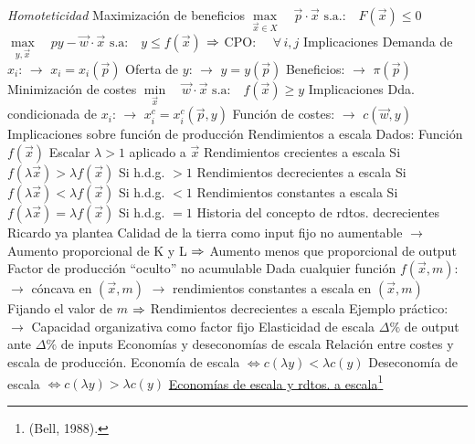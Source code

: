 \documentclass{nuevotema}
\begin{document}
\begin{esquemal}
				\4[xiii] \textit{Homoteticidad}
			\3 Maximización de beneficios
				\4[] $\underset{\vec{x} \in X}{\max} \quad \vec{p}\cdot \vec{x}$
				\4[] $\text{s.a.:} \quad F(\vec{x}) \leq 0$
				\4[] $\underset{y, \vec{x}}{\max} \quad p y - \vec{w} \cdot \vec{x}$
				\4[] $\text{s.a:} \quad y \leq f(\vec{x})$
				\4[] $\Rightarrow$ $\text{CPO:} \quad $  \quad $\forall \, i,j$
				\4 Implicaciones
				\4[] Demanda de $x_i$:
				\4[] $\to$ $x_i = x_i(\vec{p})$
				\4[] Oferta de $y$:
				\4[] $\to$ $y = y(\vec{p})$
				\4[] Beneficios:
				\4[] $\to$ $\pi(\vec{p})$
			\3 Minimización de costes
				\4[] $\underset{\vec{x}}{\min} \quad \vec{w} \cdot \vec{x}$
				\4[] $\text{s.a:} \quad f(\vec{x}) \geq y$
				\4 Implicaciones
				\4[] Dda. condicionada de $x_i$:
				\4[] $\to$ $x_i^c = x_i^c(\vec{p},y)$
				\4[] Función de costes:
				\4[] $\to$ $c(\vec{w}, y)$
		\2 Implicaciones sobre función de producción
			\3 Rendimientos a escala
				\4 Dados:
				\4[] Función $f(\vec{x})$
				\4[] Escalar $\lambda > 1$ aplicado a $\vec{x}$
				\4 Rendimientos crecientes a escala
				\4[] Si $f(\lambda \vec{x}) > \lambda f(\vec{x})$
				\4[] Si h.d.g. $> 1$
				\4 Rendimientos decrecientes a escala
				\4[] Si $f(\lambda \vec{x}) < \lambda f(\vec{x})$
				\4[] Si h.d.g. $< 1$
				\4 Rendimientos constantes a escala
				\4[] Si $f(\lambda \vec{x}) = \lambda f(\vec{x})$
				\4[] Si h.d.g. $= 1$
				\4 Historia del concepto de rdtos. decrecientes
				\4[] Ricardo ya plantea
				\4[] Calidad de la tierra como input fijo no aumentable
				\4[] $\to$ Aumento proporcional de K y L
				\4[] $\Rightarrow$ Aumento menos que proporcional de output
				\4[] Factor de producción ``oculto'' no acumulable
				\4[] Dada cualquier función $f(\vec{x},m)$:
				\4[] $\to$ cóncava en $(\vec{x}, m)$
				\4[] $\to$ rendimientos constantes a escala en $(\vec{x},m)$
				\4[] Fijando el valor de $m$
				\4[] $\Rightarrow$ Rendimientos decrecientes a escala
				\4[] Ejemplo práctico:
				\4[] $\to$ Capacidad organizativa como factor fijo
			\3 Elasticidad de escala
				\4 $\varDelta \%$ de output ante $\varDelta \%$ de inputs
				\4 
			\3 Economías y deseconomías de escala
				\4 Relación entre costes y escala de producción.
				\4[] Economía de escala $\iff c(\lambda y) < \lambda c(y)$
				\4[] Deseconomía de escala $\iff c(\lambda y) > \lambda c(y)$
				\4 \underline{Economías de escala y rdtos. a escala}\footnote{(Bell, 1988).}

\end{esquemal}
\end{document}
